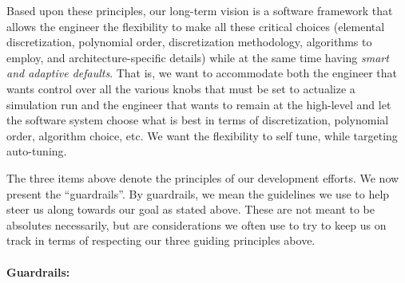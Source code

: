 Based upon these principles, our long-term vision is a software framework that allows the engineer the flexibility to make all
these critical choices (elemental discretization, polynomial order, discretization methodology, algorithms to employ, and 
architecture-specific details) while at the same time having {\em smart and adaptive defaults}.  That is, we want to 
accommodate both the engineer that wants control over all the various knobs that must be set to actualize a simulation run
and the engineer that wants to remain at the high-level and let the software system choose what is best in terms of discretization,
polynomial order, algorithm choice, etc.  We want the flexibility to self tune, while targeting auto-tuning.

The three items above denote the principles of our development efforts.  We now present the ``guardrails''.  By guardrails, we mean
the guidelines we use to help steer us along towards our goal as stated above.  These are not meant to be absolutes necessarily,
but are considerations we often use to try to keep us on track in terms of respecting our three guiding principles above.

\paragraph{Guardrails:}

